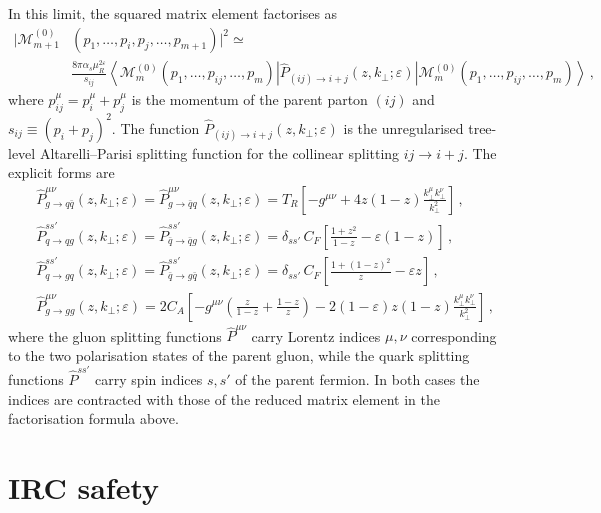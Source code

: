 In this limit, the squared matrix element factorises as 
\begin{equation}
\begin{aligned}
  |\mathcal{M}_{m+1}^{(0)}&(p_1,\ldots,p_i,p_j,\ldots,p_{m+1})|^2
  \simeq\\
  &\frac{8\pi\alpha_s\mu_R^{2\varepsilon}}{s_{ij}}
  \left\langle\mathcal{M}_m^{(0)}(p_1,\ldots,p_{ij},\ldots,p_m)
  \left|\hat{P}_{(ij)\to i +j}(z,k_\perp;\varepsilon)\right|
  \mathcal{M}_m^{(0)}(p_1,\ldots,p_{ij},\ldots,p_m)
  \right\rangle\,,
\end{aligned}
\end{equation}
where $p_{ij}^\mu = p_i^\mu + p_j^\mu$ is the momentum of the parent 
parton $(ij)$ and $s_{ij}\equiv (p_i + p_j)^2$. The function $\hat{P}_{(ij) \to i + j}(z,k_\perp;\varepsilon)$ is the unregularised
tree-level Altarelli--Parisi splitting function for the collinear
splitting $ij\to i+j$. The explicit forms are
\begin{equation}
\label{eq:AP-functions}
\begin{aligned}
  &\hat{P}_{g\to q\bar{q}}^{\mu\nu} (z,k_\perp;\varepsilon)=
   \hat{P}_{g\to \bar{q}q}^{\mu\nu} (z,k_\perp;\varepsilon)=
  T_R\!\left[-g^{\mu\nu}+4z(1-z)
  \frac{k_\perp^\mu k_\perp^\nu}{k_\perp^2}\right]\,,\\[1ex]
  &\hat{P}_{q\to qg}^{ss'} (z,k_\perp;\varepsilon)=
  \hat{P}_{\bar{q}\to \bar{q}g}^{ss'} (z,k_\perp;\varepsilon)=
  \delta_{ss'}\,C_F\!\left[\frac{1+z^2}{1-z}
  -\varepsilon(1-z)\right]\,,\\[1ex]
  &\hat{P}_{q\to gq}^{ss'} (z,k_\perp;\varepsilon)=
   \hat{P}_{\bar{q}\to g\bar{q}}^{ss'} (z,k_\perp;\varepsilon)=
  \delta_{ss'}\,C_F\!\left[\frac{1+(1-z)^2}{z}
  -\varepsilon z\right]\,,\\[1ex]
 &\hat{P}_{g\to gg}^{\mu\nu} (z,k_\perp;\varepsilon)=
  2C_A\!\left[-g^{\mu\nu}\!\left(\frac{z}{1-z}+\frac{1-z}{z}\right)
  -2(1-\varepsilon)z(1-z)
  \frac{k_\perp^\mu k_\perp^\nu}{k_\perp^2}\right]\,,
\end{aligned}
\end{equation}
where the gluon splitting functions $\hat{P}^{\mu\nu}$ carry Lorentz
indices $\mu,\nu$ corresponding to the two polarisation states
of the parent gluon, while the quark splitting functions
$\hat{P}^{ss'}$ carry spin indices $s,s'$ of the parent
fermion. In both cases the indices are contracted with those of the reduced
matrix element in the factorisation formula above. 

\section{IRC safety} 
\label{sec:IRC}

